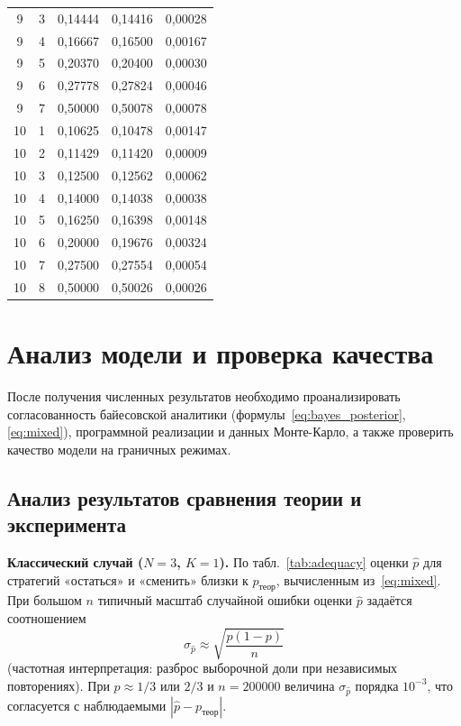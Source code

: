 \documentclass[a4paper, 14pt]{extarticle}
\begin{document}
{\begin{longtable}{|c|c|c|c|c|}
9 & 3 & 0{,}14444 & 0{,}14416 & 0{,}00028 \\
9 & 4 & 0{,}16667 & 0{,}16500 & 0{,}00167 \\
9 & 5 & 0{,}20370 & 0{,}20400 & 0{,}00030 \\
9 & 6 & 0{,}27778 & 0{,}27824 & 0{,}00046 \\
9 & 7 & 0{,}50000 & 0{,}50078 & 0{,}00078 \\
\hline
10 & 1 & 0{,}10625 & 0{,}10478 & 0{,}00147 \\
10 & 2 & 0{,}11429 & 0{,}11420 & 0{,}00009 \\
10 & 3 & 0{,}12500 & 0{,}12562 & 0{,}00062 \\
10 & 4 & 0{,}14000 & 0{,}14038 & 0{,}00038 \\
10 & 5 & 0{,}16250 & 0{,}16398 & 0{,}00148 \\
10 & 6 & 0{,}20000 & 0{,}19676 & 0{,}00324 \\
10 & 7 & 0{,}27500 & 0{,}27554 & 0{,}00054 \\
10 & 8 & 0{,}50000 & 0{,}50026 & 0{,}00026 \\
\hline
\end{longtable}
}

\section{Анализ модели и проверка качества}

После получения численных результатов необходимо проанализировать согласованность байесовской аналитики (формулы~\eqref{eq:bayes_posterior}, \eqref{eq:mixed}), программной реализации и данных Монте-Карло, а также проверить качество модели на граничных режимах.

\subsection{Анализ результатов сравнения теории и эксперимента}

\textbf{Классический случай ($N=3$, $K=1$).}
По табл.~\ref{tab:adequacy} оценки $\hat p$ для стратегий «остаться» и «сменить» близки к $p_{\text{теор}}$, вычисленным из~\eqref{eq:mixed}. При большом $n$ типичный масштаб случайной ошибки оценки $\hat p$ задаётся соотношением
\[
  \sigma_{\hat p} \approx \sqrt{\frac{p(1-p)}{n}}
\]
(частотная интерпретация: разброс выборочной доли при независимых повторениях). При $p\approx 1/3$ или $2/3$ и $n=200000$ величина $\sigma_{\hat p}$ порядка $10^{-3}$, что согласуется с наблюдаемыми $| \hat p - p_{\text{теор}} |$.
\end{document}
